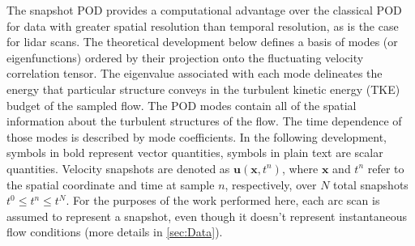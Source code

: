 \documentclass[%
 aip,
 amsmath,
 amssymb,
preprint,%
]{revtex4-2}
\begin{document}
The snapshot POD \cite{Sirovich1987} provides a computational advantage over the classical POD \cite{Lumley1967} for data with greater spatial resolution than temporal resolution, as is the case for lidar scans. 
The theoretical development below defines a basis of modes (or eigenfunctions) ordered by their projection onto the fluctuating velocity correlation tensor. 
The eigenvalue associated with each mode delineates the energy that particular structure conveys in the turbulent kinetic energy (TKE) budget of the sampled flow. 
The POD modes contain all of the spatial information about the turbulent structures of the flow.
The time dependence of those modes is described by mode coefficients.
In the following development, symbols in bold represent vector quantities, symbols in plain text are scalar quantities. Velocity snapshots are denoted as $\bm{u}(\bm{x},t^n)$, where $\bm{x}$ and $t^n$ refer to the spatial coordinate and time at sample $n$, respectively, over $N$ total snapshots $t^0 \le t^n \le t^N $. For the purposes of the work performed here, each arc scan is assumed to represent a snapshot, even though it doesn't represent instantaneous flow conditions (more details in \cref{sec:Data}).
\end{document}
